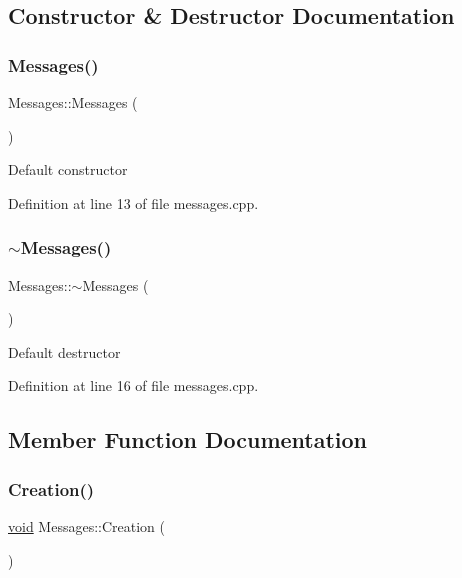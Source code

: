 \subsection{Constructor \& Destructor Documentation}
\mbox{\label{class_messages_abd3013dea54bfd87550739c3fa6e20d5}} 
\subsubsection{\texorpdfstring{Messages()}{Messages()}}
{\footnotesize\ttfamily Messages\+::\+Messages (\begin{DoxyParamCaption}{ }\end{DoxyParamCaption})}

Default constructor 

Definition at line 13 of file messages.\+cpp.

\mbox{\label{class_messages_ab0060ed5667e5dd2d47811df6c42d462}} 
\subsubsection{\texorpdfstring{$\sim$\+Messages()}{~Messages()}}
{\footnotesize\ttfamily Messages\+::$\sim$\+Messages (\begin{DoxyParamCaption}{ }\end{DoxyParamCaption})\hspace{0.3cm}{\ttfamily [virtual]}}

Default destructor 

Definition at line 16 of file messages.\+cpp.



\subsection{Member Function Documentation}
\mbox{\label{class_messages_ac575287a8c19833d30480c5fb1769dfa}} 
\subsubsection{\texorpdfstring{Creation()}{Creation()}}
{\footnotesize\ttfamily \mbox{\hyperlink{glad_8h_a950fc91edb4504f62f1c577bf4727c29}{void}} Messages\+::\+Creation (\begin{DoxyParamCaption}{ }\end{DoxyParamCaption})\hspace{0.3cm}{\ttfamily [inline]}}




